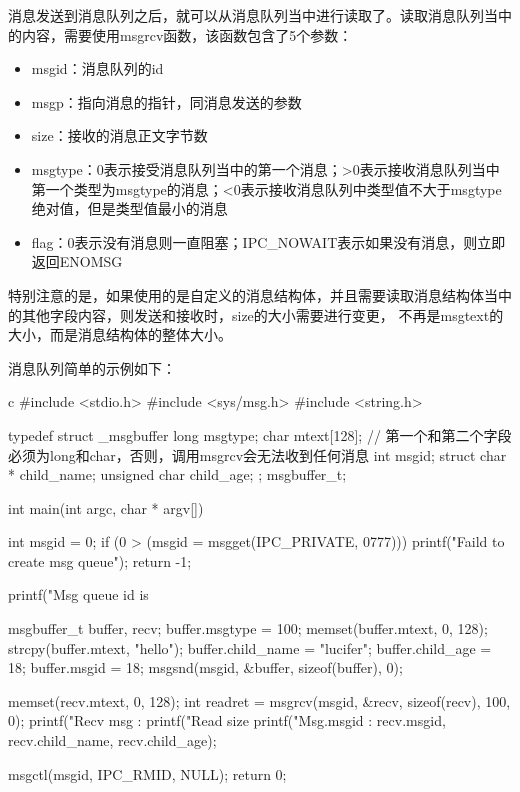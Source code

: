 消息发送到消息队列之后，就可以从消息队列当中进行读取了。读取消息队列当中的内容，需要使用msgrcv函数，该函数包含了5个参数：
\begin{itemize}
  \item msgid：消息队列的id
  \item msgp：指向消息的指针，同消息发送的参数
  \item size：接收的消息正文字节数
  \item msgtype：0表示接受消息队列当中的第一个消息；>0表示接收消息队列当中第一个类型为msgtype的消息；<0表示接收消息队列中类型值不大于msgtype绝对值，但是类型值最小的消息
  \item flag：0表示没有消息则一直阻塞；IPC\_NOWAIT表示如果没有消息，则立即返回ENOMSG
\end{itemize}

特别注意的是，如果使用的是自定义的消息结构体，并且需要读取消息结构体当中的其他字段内容，则发送和接收时，size的大小需要进行变更，
不再是msgtext的大小，而是消息结构体的整体大小。

消息队列简单的示例如下：
\begin{code-block}{c}
#include <stdio.h>
#include <sys/msg.h>
#include <string.h>

typedef struct _msgbuffer{
        long msgtype;
        char mtext[128]; // 第一个和第二个字段必须为long和char，否则，调用msgrcv会无法收到任何消息
        int msgid;
        struct {
            char * child_name;
            unsigned char child_age;
        };
}msgbuffer_t;

int main(int argc, char * argv[])
{
        int msgid = 0;
        if (0 > (msgid = msgget(IPC_PRIVATE, 0777)))
        {
                printf("Faild to create msg queue\n");
                return -1;
        }

        printf("Msg queue id is %

        msgbuffer_t buffer, recv;
        buffer.msgtype = 100;
        memset(buffer.mtext, 0, 128);
        strcpy(buffer.mtext, "hello");
        buffer.child_name = "lucifer";
        buffer.child_age = 18;
        buffer.msgid = 18;
        msgsnd(msgid, &buffer, sizeof(buffer), 0);

        memset(recv.mtext, 0, 128);
        int readret = msgrcv(msgid, &recv,
                sizeof(recv), 100, 0);
        printf("Recv msg :%
        printf("Read size %
        printf("Msg.msgid :%
            recv.msgid, recv.child_name, recv.child_age);

        msgctl(msgid, IPC_RMID, NULL);
        return 0;
}
\end{code-block}

